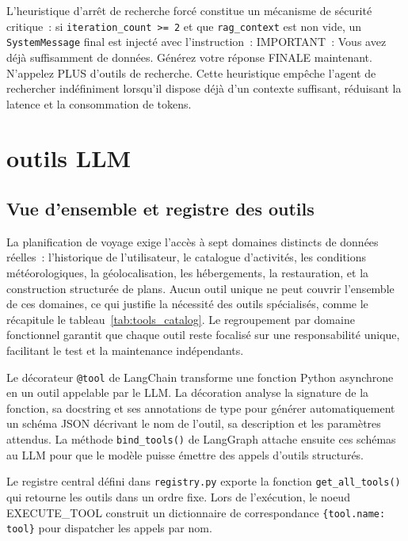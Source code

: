 L'heuristique d'arrêt de recherche forcé constitue un mécanisme de sécurité critique~: si
\texttt{iteration\_count >= 2} et que \texttt{rag\_context} est non vide, un
\texttt{SystemMessage} final est injecté avec l'instruction~: \og{}IMPORTANT~: Vous avez déjà
suffisamment de données. Générez votre réponse FINALE maintenant. N'appelez PLUS d'outils de
recherche.\fg{} Cette heuristique empêche l'agent de rechercher indéfiniment lorsqu'il dispose
déjà d'un contexte suffisant, réduisant la latence et la consommation de tokens.



\section{outils LLM}

\subsection{Vue d'ensemble et registre des outils}

La planification de voyage exige l'accès à sept domaines distincts de données réelles~:
l'historique de l'utilisateur, le catalogue d'activités, les conditions météorologiques, la
géolocalisation, les hébergements, la restauration, et la construction structurée de plans.
Aucun outil unique ne peut couvrir l'ensemble de ces domaines, ce qui justifie la nécessité
des outils spécialisés, comme le récapitule le tableau~\ref{tab:tools_catalog}. Le regroupement par domaine fonctionnel garantit que chaque
outil reste focalisé sur une responsabilité unique, facilitant le test et la maintenance
indépendants.

Le décorateur \texttt{@tool} de LangChain transforme une fonction Python asynchrone en un outil
appelable par le LLM. La décoration analyse la signature de la fonction, sa docstring et ses
annotations de type pour générer automatiquement un schéma JSON décrivant le nom de l'outil, sa
description et les paramètres attendus. La méthode \texttt{bind\_tools()} de LangGraph attache
ensuite ces schémas au LLM pour que le modèle puisse émettre des appels d'outils structurés.

Le registre central défini dans \texttt{registry.py} exporte la fonction
\texttt{get\_all\_tools()} qui retourne les outils dans un ordre fixe. Lors de l'exécution,
le noeud EXECUTE\_TOOL construit un dictionnaire de correspondance
\texttt{\{tool.name: tool\}} pour dispatcher les appels par nom. 

